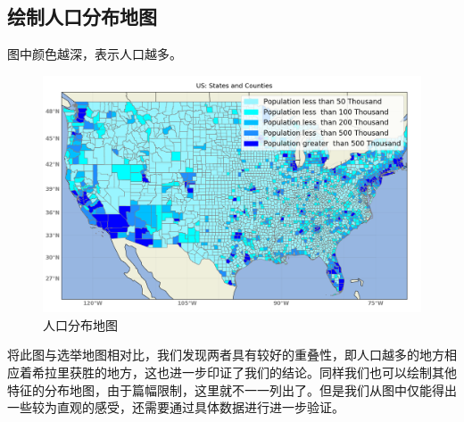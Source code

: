 \documentclass[
12pt, %
UTF8
]{fphw}
\begin{document}
	\subsection{绘制人口分布地图}
	图中颜色越深，表示人口越多。
	\begin{figure}[H]
		\centering
		\includegraphics[scale = 0.7]{people_map.png}
		\caption{人口分布地图}
	\end{figure}
	将此图与选举地图相对比，我们发现两者具有较好的重叠性，即人口越多的地方相应着希拉里获胜的地方，这也进一步印证了我们的结论。同样我们也可以绘制其他特征的分布地图，由于篇幅限制，这里就不一一列出了。但是我们从图中仅能得出一些较为直观的感受，还需要通过具体数据进行进一步验证。	
\end{document}
